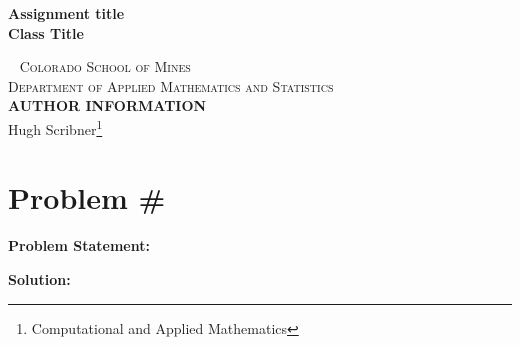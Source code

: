 \documentclass[12pt]{article}
\begin{document}
\newpage
\newpage
\newtheorem{theorem}{Theorem}

\begin{titlepage}

    \begin{center}
        \vspace*{2.5in}
            \huge
            \textbf{{Assignment title}}\\
            \large
            \textbf{Class Title}\\
    \end{center}
    ~\vfill
    \noindent \textsc{Colorado School of Mines}\\
    \textsc{Department of Applied Mathematics and Statistics}\\
    
    \vspace{1cm}
    \noindent \textsc{\textbf{AUTHOR INFORMATION}}\\
    \noindent Hugh Scribner\footnote{Computational and Applied Mathematics}\\ 
    \vspace{1mm}
    
\end{titlepage}

\newpage

\tableofcontents

\newpage

\newpage
\section{Problem \#}
 \begin{tcolorbox}
        \textbf{Problem Statement:}\\
        
    \end{tcolorbox}
    
    \textbf{Solution:}
    
\end{document}
